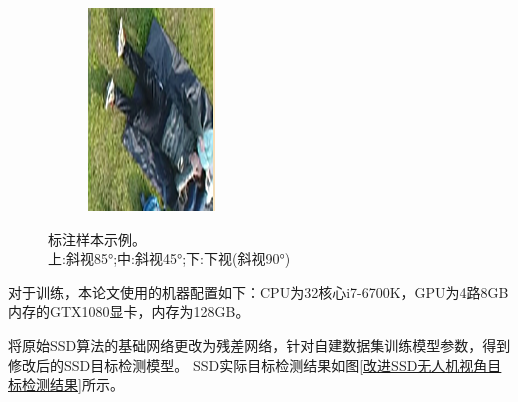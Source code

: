 \begin{figure}[h]
\begin{subfigure}[h]{0.11\textwidth}
        \includegraphics[width=\textwidth]{figures/样本标注示例9.png}
    \end{subfigure}
    \caption{标注样本示例。\\ 上:斜视85°;\quad 中:斜视45°;\quad 下:下视(斜视90°)}\label{标注样本示例}
\end{figure}

对于训练，本论文使用的机器配置如下：CPU为32核心i7-6700K，GPU为4路8GB内存的GTX1080显卡，内存为128GB。

将原始SSD算法的基础网络更改为残差网络，针对自建数据集训练模型参数，得到修改后的SSD目标检测模型。
SSD实际目标检测结果如图\ref{改进SSD无人机视角目标检测结果}所示。
 	 

